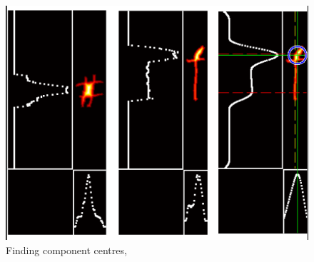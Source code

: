 \begin{figure}[hbt]
  \centering
  \includegraphics{gfx/prior-research/giloh-component-centre}
  \caption{Finding component centres, \parencite{benoptical}}
  \label{fig:giloh-component-centre}
\end{figure}
